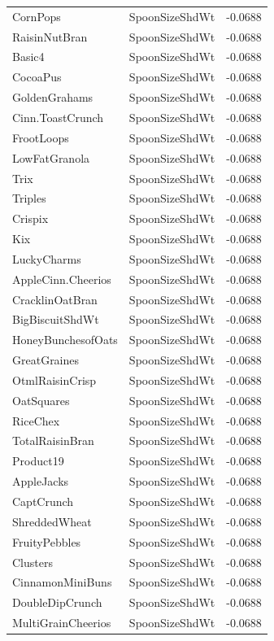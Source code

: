 \begin{table}[!htbp]
\begin{tabular}{lll}
\\
CornPops & SpoonSizeShdWt & -0.0688
\\
RaisinNutBran & SpoonSizeShdWt & -0.0688
\\
Basic4 & SpoonSizeShdWt & -0.0688
\\
CocoaPus & SpoonSizeShdWt & -0.0688
\\
GoldenGrahams & SpoonSizeShdWt & -0.0688
\\
Cinn.ToastCrunch & SpoonSizeShdWt & -0.0688
\\
FrootLoops & SpoonSizeShdWt & -0.0688
\\
LowFatGranola & SpoonSizeShdWt & -0.0688
\\
Trix & SpoonSizeShdWt & -0.0688
\\
Triples & SpoonSizeShdWt & -0.0688
\\
Crispix & SpoonSizeShdWt & -0.0688
\\
Kix & SpoonSizeShdWt & -0.0688
\\
LuckyCharms & SpoonSizeShdWt & -0.0688
\\
AppleCinn.Cheerios & SpoonSizeShdWt & -0.0688
\\
CracklinOatBran & SpoonSizeShdWt & -0.0688
\\
BigBiscuitShdWt & SpoonSizeShdWt & -0.0688
\\
HoneyBunchesofOats & SpoonSizeShdWt & -0.0688
\\
GreatGraines & SpoonSizeShdWt & -0.0688
\\
OtmlRaisinCrisp & SpoonSizeShdWt & -0.0688
\\
OatSquares & SpoonSizeShdWt & -0.0688
\\
RiceChex & SpoonSizeShdWt & -0.0688
\\
TotalRaisinBran & SpoonSizeShdWt & -0.0688
\\
Product19 & SpoonSizeShdWt & -0.0688
\\
AppleJacks & SpoonSizeShdWt & -0.0688
\\
CaptCrunch & SpoonSizeShdWt & -0.0688
\\
ShreddedWheat & SpoonSizeShdWt & -0.0688
\\
FruityPebbles & SpoonSizeShdWt & -0.0688
\\
Clusters & SpoonSizeShdWt & -0.0688
\\
CinnamonMiniBuns & SpoonSizeShdWt & -0.0688
\\
DoubleDipCrunch & SpoonSizeShdWt & -0.0688
\\
MultiGrainCheerios & SpoonSizeShdWt & -0.0688
\\

\end{tabular}
\end{table}
